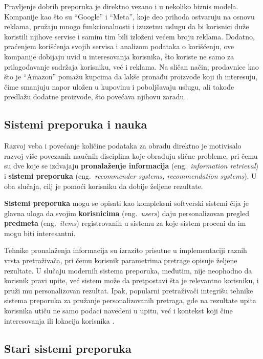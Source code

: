 \documentclass[a4paper]{article}
\begin{document}
Pravljenje dobrih preporuka je direktno vezano i u nekoliko biznis modela. Kompanije kao što su ``Google'' i ``Meta'', koje deo prihoda ostvaruju na osnovu reklama, pružaju mnogo funkcionalnosti i izuzetnu uslugu da bi korisnici duže koristili njihove servise i samim tim bili izloženi većem broju reklama. Dodatno, praćenjem korišćenja svojih servisa i analizom podataka o korišćenju, ove kompanije dobijaju uvid u interesovanja korisnika, što koriste ne samo za prilagođavanje sadržaja korisniku, već i reklama. Na sličan način, prodavnice kao što je ``Amazon'' pomažu kupcima da lakše pronađu proizvode koji ih interesuju, čime smanjuju napor uložen u kupovinu i poboljšavaju uslugu, ali takođe predlažu dodatne proizvode, što povećava njihovu zaradu.

\subsection{Sistemi preporuka i nauka}
\label{subsec:nauka}

Razvoj veba i povećanje količine podataka za obradu direktno je motivisalo razvoj više povezanih naučnih disciplina koje obrađuju slične probleme, pri čemu su dve koje se izdvajaju \textbf{pronalaženje informacija} (eng.~{\em information retrieval}) i \textbf{sistemi preporuka} (eng.~{\em recommender systems, recommendation systems}). U oba slučaja, cilj je pomoći korisniku da dobije željene rezultate.

\textbf{Sistemi preporuka} mogu se opisati kao kompleksni softverski sistemi čija je glavna uloga da svojim \textbf{korisnicima} (eng.~{\em users}) daju personalizovan pregled \textbf{predmeta} (eng.~{\em items}) registrovanih u sistemu za koje sistem proceni da im mogu biti interesantni.

Tehnike pronalaženja informacija su izrazito prisutne u implementaciji raznih vrsta pretraživača, pri čemu korisnik parametrima pretrage opisuje željene rezultate. U slučaju modernih sistema preporuka, međutim, nije neophodno da korisnik pravi upite, već sistem može da pretpostavi šta je relevantno korisniku, i pruži mu personalizovan rezultat. Ipak, popularni pretraživači integrišu tehnike sistema preporuka za pružanje personalizovanih pretraga, gde na rezultate upita korisnika utiču ne samo podaci navedeni u upitu, već i kontekst koji čine interesovanja ili lokacija korisnika \cite{aggarwal_recommender_2016}.

\subsection{Stari sistemi preporuka}
\label{subsec:stari_sistemi_preporuka}
\end{document}
